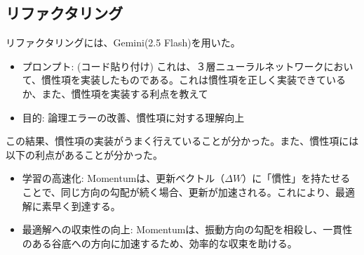 \documentclass[11px,a4,dvipdfmx]{jsarticle}
\begin{document}
\subsection{リファクタリング}
リファクタリングには、Gemini(2.5 Flash)を用いた。
\begin{itemize}
    \item プロンプト: (コード貼り付け)  これは、３層ニューラルネットワークにおいて、慣性項を実装したものである。これは慣性項を正しく実装できているか、また、慣性項を実装する利点を教えて
    \item 目的: 論理エラーの改善、慣性項に対する理解向上
\end{itemize}
この結果、慣性項の実装がうまく行えていることが分かった。また、慣性項には以下の利点があることが分かった。
\begin{itemize}
    \item 学習の高速化: Momentumは、更新ベクトル（$\Delta W$）に「慣性」を持たせることで、同じ方向の勾配が続く場合、更新が加速される。これにより、最適解に素早く到達する。
    \item 最適解への収束性の向上: Momentumは、振動方向の勾配を相殺し、一貫性のある谷底への方向に加速するため、効率的な収束を助ける。
\end{itemize}
\end{document}
